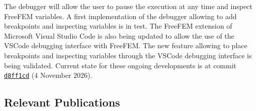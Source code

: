 The debugger will allow the user to pause the execution at any time and inspect FreeFEM variables. A first implementation of the debugger allowing to add breakpoints and inspecting variables is in test. The FreeFEM extension of Microsoft Visual Studio Code is also being updated to allow the use of the VSCode debugging interface with FreeFEM. The new feature allowing to place  breakpoints and inspecting variables through the VSCode debugging interface is being validated.
Current state for these ongoing developments is at commit \href{https://github.com/FreeFem/FreeFem-sources/commit/d8ff1cdc9289a263d630bef4dc2d73b52d7e1794}{\texttt{d8ff1cd}} (4 November 2026).

\subsection{Relevant Publications}
\label{sec:Freefem++:publications}

